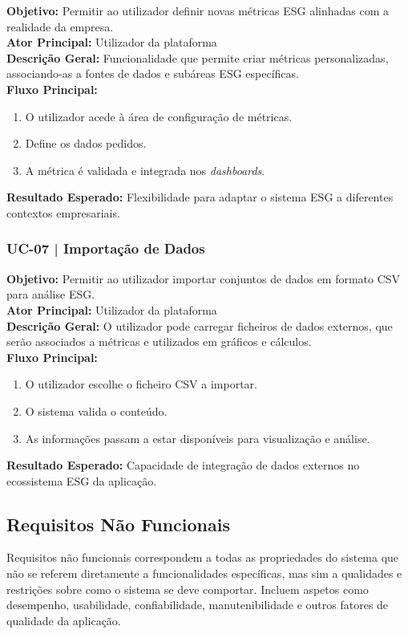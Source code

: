 \textbf{Objetivo:} Permitir ao utilizador definir novas métricas ESG alinhadas com a realidade da empresa.\\
\textbf{Ator Principal:} Utilizador da plataforma\\
\textbf{Descrição Geral:} Funcionalidade que permite criar métricas personalizadas, associando-as a fontes de dados e subáreas ESG específicas.\\
\textbf{Fluxo Principal:}
\begin{enumerate}
    \item O utilizador acede à área de configuração de métricas.
    \item Define os dados pedidos.
    \item A métrica é validada e integrada nos \textit{dashboards}.
\end{enumerate}
\textbf{Resultado Esperado:} Flexibilidade para adaptar o sistema ESG a diferentes contextos empresariais.

\subsubsection{UC-07 | Importação de Dados}

\textbf{Objetivo:} Permitir ao utilizador importar conjuntos de dados em formato CSV para análise ESG.\\
\textbf{Ator Principal:} Utilizador da plataforma\\
\textbf{Descrição Geral:} O utilizador pode carregar ficheiros de dados externos, que serão associados a métricas e utilizados em gráficos e cálculos.\\
\textbf{Fluxo Principal:}
\begin{enumerate}
    \item O utilizador escolhe o ficheiro CSV a importar.
    \item O sistema valida o conteúdo.
    \item As informações passam a estar disponíveis para visualização e análise.
\end{enumerate}
\textbf{Resultado Esperado:} Capacidade de integração de dados externos no ecossistema ESG da aplicação.


\subsection{Requisitos Não Funcionais}

Requisitos não funcionais correspondem a todas as propriedades do sistema que não se referem diretamente a funcionalidades específicas, mas sim a qualidades e restrições sobre como o sistema se deve comportar. Incluem aspetos como desempenho, usabilidade, confiabilidade, manutenibilidade e outros fatores de qualidade da aplicação.

